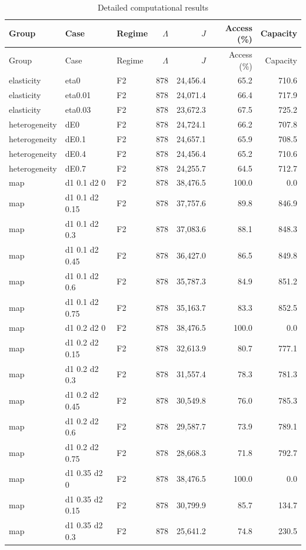 \begin{longtable}{p{1.8cm}p{3.35cm}lrrrr}
\caption{Detailed computational results}\label{tab:all}\\
\toprule Group & Case & Regime & $\Lambda$ & $J$ & Access (\%) & Capacity\\\midrule\endfirsthead
\toprule Group & Case & Regime & $\Lambda$ & $J$ & Access (\%) & Capacity\\\midrule\endhead
elasticity & eta0 & F2 & 878 & 24,456.4 & 65.2 & 710.6\\
elasticity & eta0.01 & F2 & 878 & 24,071.4 & 66.4 & 717.9\\
elasticity & eta0.03 & F2 & 878 & 23,672.3 & 67.5 & 725.2\\
heterogeneity & dE0 & F2 & 878 & 24,724.1 & 66.2 & 707.8\\
heterogeneity & dE0.1 & F2 & 878 & 24,657.1 & 65.9 & 708.5\\
heterogeneity & dE0.4 & F2 & 878 & 24,456.4 & 65.2 & 710.6\\
heterogeneity & dE0.7 & F2 & 878 & 24,255.7 & 64.5 & 712.7\\
map & d1 0.1 d2 0 & F2 & 878 & 38,476.5 & 100.0 & 0.0\\
map & d1 0.1 d2 0.15 & F2 & 878 & 37,757.6 & 89.8 & 846.9\\
map & d1 0.1 d2 0.3 & F2 & 878 & 37,083.6 & 88.1 & 848.3\\
map & d1 0.1 d2 0.45 & F2 & 878 & 36,427.0 & 86.5 & 849.8\\
map & d1 0.1 d2 0.6 & F2 & 878 & 35,787.3 & 84.9 & 851.2\\
map & d1 0.1 d2 0.75 & F2 & 878 & 35,163.7 & 83.3 & 852.5\\
map & d1 0.2 d2 0 & F2 & 878 & 38,476.5 & 100.0 & 0.0\\
map & d1 0.2 d2 0.15 & F2 & 878 & 32,613.9 & 80.7 & 777.1\\
map & d1 0.2 d2 0.3 & F2 & 878 & 31,557.4 & 78.3 & 781.3\\
map & d1 0.2 d2 0.45 & F2 & 878 & 30,549.8 & 76.0 & 785.3\\
map & d1 0.2 d2 0.6 & F2 & 878 & 29,587.7 & 73.9 & 789.1\\
map & d1 0.2 d2 0.75 & F2 & 878 & 28,668.3 & 71.8 & 792.7\\
map & d1 0.35 d2 0 & F2 & 878 & 38,476.5 & 100.0 & 0.0\\
map & d1 0.35 d2 0.15 & F2 & 878 & 30,799.9 & 85.7 & 134.7\\
map & d1 0.35 d2 0.3 & F2 & 878 & 25,641.2 & 74.8 & 230.5\\

\end{longtable}
